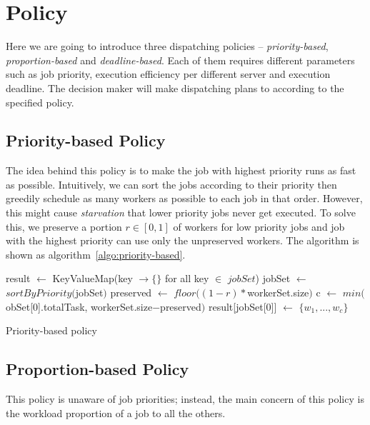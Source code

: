 \chapter{Policy}

Here we are going to introduce three dispatching policies --
\emph{priority-based}, \emph{proportion-based} and
\emph{deadline-based}.
Each of them requires different parameters such as job priority,
execution efficiency per different server and execution deadline.
The decision maker will make dispatching plans to according
to the specified policy.


\section{Priority-based Policy}

The idea behind this policy is to make the job with highest priority
runs as fast as possible.
Intuitively, we can sort the jobs according to their priority then
greedily schedule as many workers as possible to each job in that order.
However, this might cause \emph{starvation} that lower priority jobs
never get executed.
To solve this, we preserve a portion $r \in [0,1]$ of workers for low
priority jobs and job with the highest priority can use only the
unpreserved workers.
The algorithm is shown as algorithm~\ref{algo:priority-based}.

\begin{algorithm}
  \DontPrintSemicolon %
  result $\gets$ KeyValueMap(key $\to \{\}$ for all key $\in$ $jobSet$)\;
  jobSet $\gets$ $sortByPriority($jobSet$)$\;
  preserved $\gets$ $floor((1-r) * $workerSet.size$)$\;
  c $\gets$ $min($obSet[0].totalTask, workerSet.size$-$preserved$)$\;
  result[jobSet[0]] $\gets$ $\{w_1, ..., w_c\}$\;
  \;
  \caption{Priority-based policy}
  \label{algo:priority-based}
\end{algorithm}

\section{Proportion-based Policy}
This policy is unaware of job priorities; instead, the main concern of
this policy is the workload proportion of a job to all the others.


